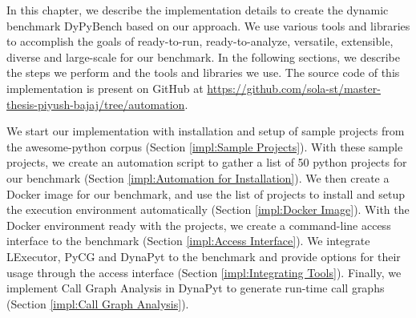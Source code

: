 In this chapter, we describe the implementation details to create the dynamic benchmark DyPyBench based on our approach.
We use various tools and libraries to accomplish the goals of ready-to-run, ready-to-analyze, versatile, extensible, diverse and large-scale for our benchmark.
In the following sections, we describe the steps we perform and the tools and libraries we use.
The source code of this implementation is present on GitHub at \url{https://github.com/sola-st/master-thesis-piyush-bajaj/tree/automation}.

We start our implementation with installation and setup of sample projects from the awesome-python corpus (Section \ref{impl:Sample Projects}).
With these sample projects, we create an automation script to gather a list of 50 python projects for our benchmark (Section \ref{impl:Automation for Installation}).
We then create a Docker image for our benchmark, and use the list of projects to install and setup the execution environment automatically (Section \ref{impl:Docker Image}).
With the Docker environment ready with the projects, we create a command-line access interface to the benchmark (Section \ref{impl:Access Interface}).   
We integrate LExecutor, PyCG and DynaPyt to the benchmark and provide options for their usage through the access interface (Section \ref{impl:Integrating Tools}).
Finally, we implement Call Graph Analysis in DynaPyt to generate run-time call graphs (Section \ref{impl:Call Graph Analysis}).

